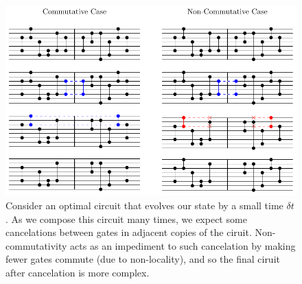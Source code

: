 \documentclass[10pt]{beamer}
\begin{document}
\begin{frame}
\begin{figure}
    \begin{center}
        \includegraphics[scale=0.6]{cartoon}
    \end{center}
   \caption{Consider an optimal circuit that evolves our state by a small time $\delta t$. As we compose this circuit many times, we expect some cancelations between gates in adjacent copies of the ciruit. Non-commutativity acts as an impediment to such cancelation by making fewer gates commute (due to non-locality), and so the final ciruit after cancelation is more complex.} \label{fig:cartoon1}
\end{figure}

\end{frame}
\end{document}
